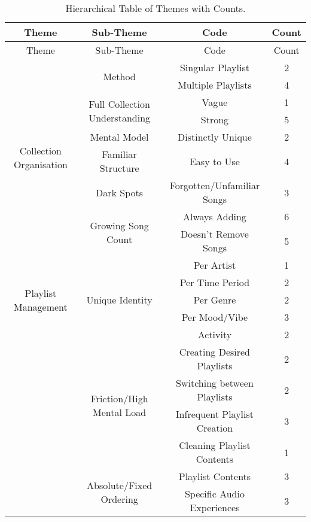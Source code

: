 \begin{longtable}[c]{| c | c | c | c|}
    \caption{Hierarchical Table of Themes with Counts.} \\
    \toprule
    Theme & Sub-Theme & Code & Count\\
    \midrule
    \endfirsthead
    
    \toprule
    Theme & Sub-Theme & Code & Count\\
    \midrule
    \endhead

    \multirow{9}{6em}{
        Collection Organisation
    } & \multirow{2}{*}{Method} & Singular Playlist & 2\\* \cmidrule{3-4}
            & & Multiple Playlists & 4 \\*
        \cmidrule{2-4}
        & \multirow{2}{*}{Full Collection Understanding} & Vague & 1\\*  
            \cmidrule{3-4}
            & & Strong & 5 \\*
        \cmidrule{2-4}
        & Mental Model & Distinctly Unique & 2 \\*
        & Familiar Structure & Easy to Use & 4 \\*%
        & Dark Spots & Forgotten/Unfamiliar Songs & 3\\*
        \cmidrule{2-4}
        & \multirow{2}{*}{Growing Song Count} & Always Adding & 6\\*
            \cmidrule{3-4}
            & & Doesn't Remove Songs & 5 \\*
    \midrule

    \multirow{5}{6em}{
        Playlist Management
    } & \multirow{5}{*}{Unique Identity} & Per Artist & 1 \\*
        \cmidrule{3-4}
            & & Per Time Period & 2 \\*
            \cmidrule{3-4}
            & & Per Genre & 2 \\*
            \cmidrule{3-4}
            & & Per Mood/Vibe & 3 \\*
            \cmidrule{3-4}
            & & Activity & 2 \\*
        \cmidrule{2-4}
        & \multirow{4}{*}{Friction/High Mental Load} & Creating Desired Playlists & 2\\*
        \cmidrule{3-4}
            & & Switching between Playlists & 2\\*%
            \cmidrule{3-4}
            & & Infrequent Playlist Creation & 3\\*
            \cmidrule{3-4}
            & & Cleaning Playlist Contents & 1\\*
        \cmidrule{2-4}
        & \multirow{2}{*}{Absolute/Fixed Ordering} & Playlist Contents &3\\*
        \cmidrule{3-4}
            & & Specific Audio Experiences & 3\\*
    \midrule
    

\end{longtable}
